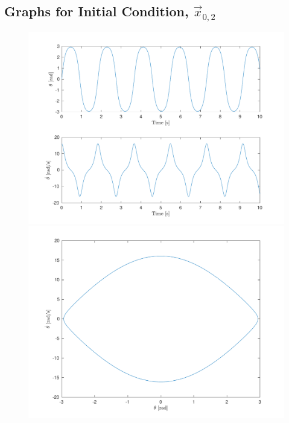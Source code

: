 \documentclass[10pt]{article}
\begin{document}
\subsection{Graphs for Initial Condition, \texorpdfstring{$\vec{x}_{0,2}$}{x02}}
\begin{figure}[ht]
    \centering
    \begin{minipage}[b]{0.45\textwidth}
        \centering
        \includegraphics[width=1\linewidth]{lab1/figs/section3_x0_2_state_evolution.pdf}
    \end{minipage}
    \begin{minipage}[b]{0.45\textwidth}
        \centering
        \includegraphics[width=1\linewidth]{lab1/figs/section3_x0_2_state_orbit.pdf}
    \end{minipage}
    
    \label{figure:x_0_2_state_evolution}
\end{figure}
\end{document}
